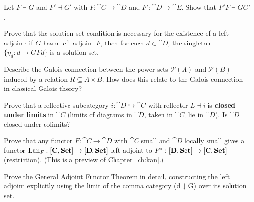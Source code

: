 \begin{exercise}
Let $F \dashv G$ and $F' \dashv G'$ with $F: \cat{C} \to \cat{D}$ and $F': \cat{D} \to \cat{E}$. Show that $F'F \dashv GG'$.
\end{exercise}

\begin{exercise}
Prove that the solution set condition is necessary for the existence of a left adjoint: if $G$ has a left adjoint $F$, then for each $d \in \cat{D}$, the singleton $\{\eta_d: d \to GFd\}$ is a solution set.
\end{exercise}

\begin{exercise}
Describe the Galois connection between the power sets $\mathcal{P}(A)$ and $\mathcal{P}(B)$ induced by a relation $R \subseteq A \times B$. How does this relate to the Galois connection in classical Galois theory?
\end{exercise}

\begin{exercise}[$\star$]
Prove that a reflective subcategory $i: \cat{D} \hookrightarrow \cat{C}$ with reflector $L \dashv i$ is \textbf{closed under limits} in $\cat{C}$ (limits of diagrams in $\cat{D}$, taken in $\cat{C}$, lie in $\cat{D}$). Is $\cat{D}$ closed under colimits?
\end{exercise}

\begin{exercise}[$\star$]
Prove that any functor $F: \cat{C} \to \cat{D}$ with $\cat{C}$ small and $\cat{D}$ locally small gives a functor $\operatorname{Lan}_F: [\mathbf{C}, \mathbf{Set}] \to [\mathbf{D},\mathbf{Set}]$ left adjoint to $F^*: [\mathbf{D},\mathbf{Set}] \to [\mathbf{C},\mathbf{Set}]$ (restriction). (This is a preview of Chapter~\ref{ch:kan}.)
\end{exercise}

\begin{exercise}[$\star\star$]
Prove the General Adjoint Functor Theorem in detail, constructing the left adjoint explicitly using the limit of the comma category (d ↓ G) over its solution set.
\end{exercise}
